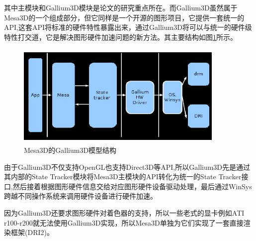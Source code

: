其中主模块和Gallium3D模块是论文的研究重点所在。而Gallium3D虽然属于Mesa3D的一个组成部分，但它同样是一个开源的图形项目，它提供一套统一的API,这套API将标准的硬件特性暴露出来，通过Gallium3D将可以与统一的硬件级特性打交道，它是解决图形硬件加速问题的新方法。其主要结构如图\ref{fig:Gallium3D}所示。

\begin{figure}[H] 
  \centering
  \includegraphics[width=10cm,height=5cm]{figures/chap02/Gallium3D}
  \caption{Mesa3D的Gallium3D模型结构}
  \label{fig:Gallium3D}
\end{figure}

由于Gallium3D不仅支持OpenGL也支持Direct3D等API,所以Gallium3D先是通过其内部的State Tracker模块将Mesa3D主模块的API转化为统一的State Tracker接口,然后接着根据图形硬件信息交给对应图形硬件设备驱动处理，最后通过WinSys跨越不同操作系统来调用硬件设备进行硬件加速。

因为Gallium3D还要求图形硬件对着色器的支持，所以一些老式的显卡例如ATI r100-r200就无法使用Gallium3D实现，所以Mesa3D单独为它们实现了一套直接渲染框架(DRI2)。


